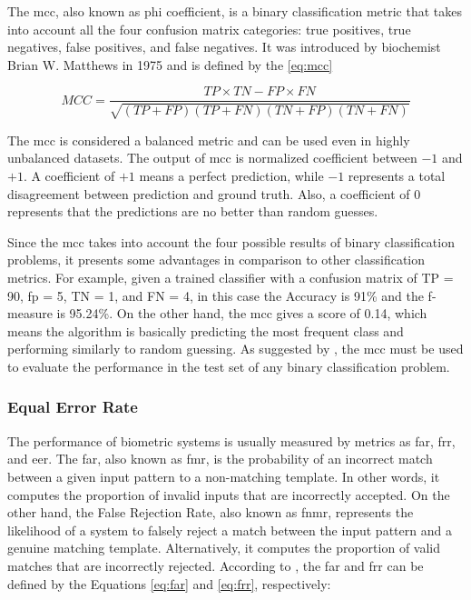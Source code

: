 The \acf{mcc}, also known as phi coefficient, is a binary classification metric that takes into account all the four confusion matrix categories: true positives, true negatives, false positives, and false negatives. It was introduced by biochemist Brian W. Matthews in 1975 \citep{matthews1975comparison} and is defined by the \autoref{eq:mcc}

\begin{equation}
\label{eq:mcc}
MCC = \frac{TP \times TN - FP \times FN}{\sqrt{(TP + FP)(TP + FN)(TN + FP)(TN + FN)}}
\end{equation}

The \acs{mcc} is considered a balanced metric and can be used even in highly unbalanced datasets. The output of \acs{mcc} is normalized coefficient between $-1$ and $+1$. A coefficient of $+1$ means a perfect prediction, while $-1$ represents a total disagreement between prediction and ground truth. Also, a coefficient of $0$ represents that the predictions are no better than random guesses. 

Since the \acs{mcc} takes into account the four possible results of binary classification problems, it presents some advantages in comparison to other classification metrics. For example, given a trained classifier with a confusion matrix of TP = 90, \acs{fp} = 5, TN = 1, and FN = 4, in this case the Accuracy is 91\% and the f-measure is 95.24\%. On the other hand, the \acs{mcc} gives a score of 0.14, which means the algorithm is basically predicting the most frequent class and performing similarly to random guessing. As suggested by \cite{chicco2017ten}, the \acs{mcc} must be used to evaluate the performance in the test set of any binary classification problem.

\subsubsection{Equal Error Rate}

The performance of biometric systems is usually measured by metrics as \acf{far}, \acf{frr}, and \acf{eer}. The \acl{far}, also known as \acf{fmr}, is the probability of an incorrect match between a given input pattern to a non-matching template. In other words, it computes the proportion of invalid inputs that are incorrectly accepted. On the other hand, the False Rejection Rate, also known as \acf{fnmr}, represents the likelihood of a system to falsely reject a match between the input pattern and a genuine matching template. Alternatively, it computes the proportion of valid matches that are incorrectly rejected. According to \cite{ross2006handbook}, the \acs{far} and \acs{frr} can be defined by the Equations \ref{eq:far} and \ref{eq:frr}, respectively:

